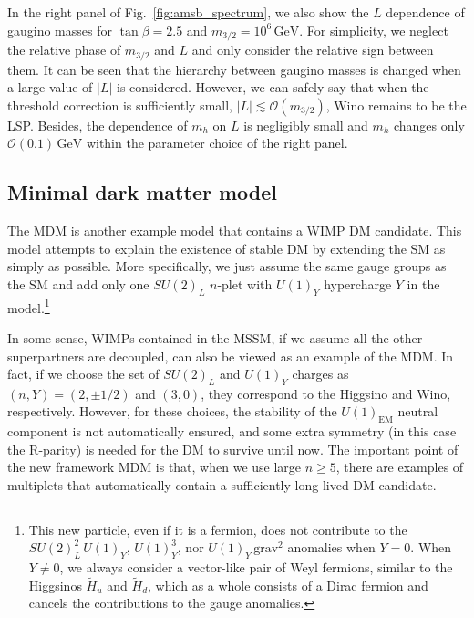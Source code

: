 \documentclass[12pt,twoside,book]{article}
\begin{document}
In the right panel of Fig.~\ref{fig:amsb_spectrum}, we also show the $L$ dependence of gaugino masses for $\tan\beta = 2.5$ and $m_{3/2} = 10^6\,\mathrm{GeV}$.
For simplicity, we neglect the relative phase of $m_{3/2}$ and $L$ and only consider the relative sign between them.
It can be seen that the hierarchy between gaugino masses is changed when a large value of $|L|$ is considered.
However, we can safely say that when the threshold correction is sufficiently small, $|L| \lesssim \mathcal{O}(m_{3/2})$, Wino remains to be the LSP.
Besides, the dependence of $m_h$ on $L$ is negligibly small and $m_h$ changes only $\mathcal{O} (0.1)\,\mathrm{GeV}$ within the parameter choice of the right panel.


\subsection{Minimal dark matter model}
\label{sec:MDM}

The MDM \cite{Cirelli:2005uq, Cirelli:2007xd, Cirelli:2009uv} is another example model that contains a WIMP DM candidate.
This model attempts to explain the existence of stable DM by extending the SM as simply as possible.
More specifically, we just assume the same gauge groups as the SM and add only one $SU(2)_L$ $n$-plet with $U(1)_Y$ hypercharge $Y$ in the model.\footnote
{
  This new particle, even if it is a fermion, does not contribute to the $SU(2)_L^2\, U(1)_Y$, $U(1)_Y^3$, nor $U(1)_Y\,\text{grav}^2$ anomalies when $Y=0$.
  When $Y \neq 0$, we always consider a vector-like pair of Weyl fermions, similar to the Higgsinos $\tilde{H}_u$ and $\tilde{H}_d$, which as a whole consists of a Dirac fermion and cancels the contributions to the gauge anomalies.
}

In some sense, WIMPs contained in the MSSM, if we assume all the other superpartners are decoupled, can also be viewed as an example of the MDM.
In fact, if we choose the set of $SU(2)_L$ and $U(1)_Y$ charges as $(n,Y) = (2,\pm 1/2)$ and $(3, 0)$, they correspond to the Higgsino and Wino, respectively.
However, for these choices, the stability of the $U(1)_{\mathrm{EM}}$ neutral component is not automatically ensured, and some extra symmetry (in this case the R-parity) is needed for the DM to survive until now.
The important point of the new framework MDM is that, when we use large $n \geq 5$, there are examples of multiplets that automatically contain a sufficiently long-lived DM candidate.
\end{document}
